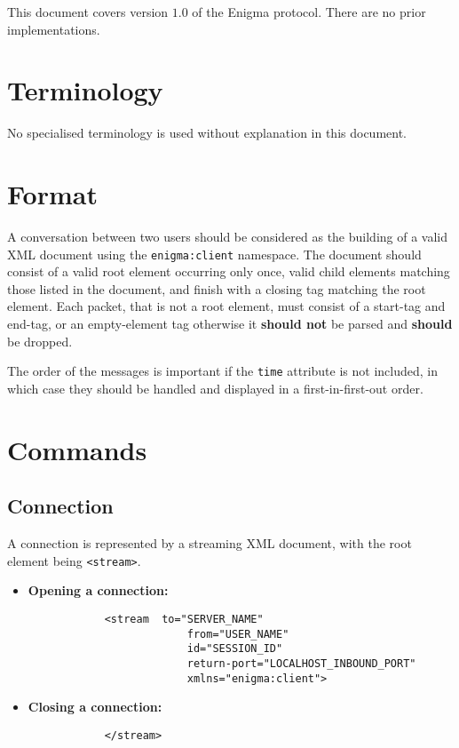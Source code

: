 This document covers version $1.0$ of the Enigma protocol. There are no prior implementations.

\section{Terminology}

No specialised terminology is used without explanation in this document.

\section{Format}

A conversation between two users should be considered as the building of a valid XML document using the \verb!enigma:client! namespace. The document should consist of a valid root element occurring only once, valid child elements matching those listed in the document, and finish with a closing tag matching the root element. Each packet, that is not a root element, must consist of a start-tag and end-tag, or an empty-element tag otherwise it \textbf{should not} be parsed and \textbf{should} be dropped.

The order of the messages is important if the \verb;time; attribute is not included, in which case they should be handled and displayed in a first-in-first-out order.

\section{Commands}

\subsection{Connection}

A connection is represented by a streaming XML document, with the root element being \verb!<stream>!.

\begin{itemize}
	\item \textbf{Opening a connection:}
		\begin{verbatim}
			<stream  to="SERVER_NAME"
				         from="USER_NAME"
				         id="SESSION_ID"
				         return-port="LOCALHOST_INBOUND_PORT"
				         xmlns="enigma:client">
		\end{verbatim}
	\item \textbf{Closing a connection:}
		\begin{verbatim}
			</stream>
		\end{verbatim}
\end{itemize}

